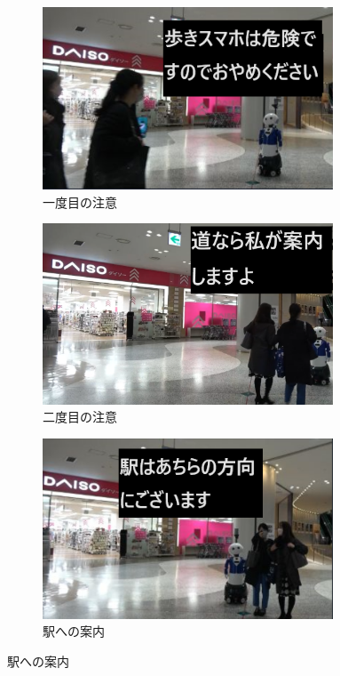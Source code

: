 \documentclass{kuisthesis}
\begin{document}
\begin{figure}[H]
  \centering
  \begin{subfigure}{0.33\textwidth}
    \centering
    \includegraphics[width=0.95\textwidth]{img/Case2-1.png}
    \caption{一度目の注意}
    \label{fig: Case2_1}
  \end{subfigure}
  \begin{subfigure}{0.33\textwidth}
    \centering
    \includegraphics[width=0.95\textwidth]{img/Case2-2.png}
    \caption{二度目の注意}
    \label{fig: Case2_2}
  \end{subfigure}
  \begin{subfigure}{0.33\textwidth}
    \centering
    \includegraphics[width=0.95\textwidth]{img/Case2-3.png}
    \caption{駅への案内}
    \label{fig: Case2_3}
  \end{subfigure}
  \label{fig: Case2}
\end{figure}
\end{document}
